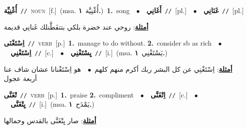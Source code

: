 \documentclass[10pt,a4paper,twoside]{article} %
\begin{document}
\begin{multicols}{2}
{\setlength\topsep{0pt}\textbf{\foreignlanguage{arabic}{أُغْنِيِّة}}\ {\color{gray}\texttt{//}\color{black}}\ \textsc{noun}\ [f.]\ \color{gray}(msa. \foreignlanguage{arabic}{أُغْنِيَّة}~\foreignlanguage{arabic}{\textbf{١.}})\color{black}\ \textbf{1.}~song\ \ $\bullet$\ \ \setlength\topsep{0pt}\textbf{\foreignlanguage{arabic}{أَغَانِي}}\ {\color{gray}\texttt{//}\color{black}}\ [pl.]\ \ $\bullet$\ \ \setlength\topsep{0pt}\textbf{\foreignlanguage{arabic}{غَنَانِي}}\ {\color{gray}\texttt{//}\color{black}}\ [pl.]\  \begin{flushright}\color{gray}\foreignlanguage{arabic}{\textbf{\underline{\foreignlanguage{arabic}{أمثلة}}}: روحي عند خضرة بلكي بتتفَطَّنلك غَنانِي قديمة}\end{flushright}\color{black}} \vspace{2mm}

{\setlength\topsep{0pt}\textbf{\foreignlanguage{arabic}{اِسْتَغْنَى}}\ {\color{gray}\texttt{//}\color{black}}\ \textsc{verb}\ [p.]\ \textbf{1.}~manage to do without.  \textbf{2.}~consider sb as rich\ \ $\bullet$\ \ \setlength\topsep{0pt}\textbf{\foreignlanguage{arabic}{اِسْتَغْنِي}}\ {\color{gray}\texttt{//}\color{black}}\ [c.]\ \ $\bullet$\ \ \setlength\topsep{0pt}\textbf{\foreignlanguage{arabic}{يِسْتَغْنِي}}\ {\color{gray}\texttt{//}\color{black}}\ [i.]\ \color{gray}(msa. \foreignlanguage{arabic}{يَسْتَغْنِي}~\foreignlanguage{arabic}{\textbf{١.}})\color{black}\  \begin{flushright}\color{gray}\foreignlanguage{arabic}{\textbf{\underline{\foreignlanguage{arabic}{أمثلة}}}: اِسْتَغْنِي عن كل البشر ربك أكرم منهم كلهم\ $\bullet$\ \  هو اِسْتَغْنانا عشان شاف عنا أربعة عجول}\end{flushright}\color{black}} \vspace{2mm}

{\setlength\topsep{0pt}\textbf{\foreignlanguage{arabic}{تْغَنَّى}}\ {\color{gray}\texttt{//}\color{black}}\ \textsc{verb}\ [p.]\ \textbf{1.}~praise  \textbf{2.}~compliment\ \ $\bullet$\ \ \setlength\topsep{0pt}\textbf{\foreignlanguage{arabic}{اِتْغَنَّى}}\ {\color{gray}\texttt{//}\color{black}}\ [c.]\ \ $\bullet$\ \ \setlength\topsep{0pt}\textbf{\foreignlanguage{arabic}{يِتْغَنَّى}}\ {\color{gray}\texttt{//}\color{black}}\ [i.]\ \color{gray}(msa. \foreignlanguage{arabic}{يَمْدَح}~\foreignlanguage{arabic}{\textbf{١.}})\color{black}\  \begin{flushright}\color{gray}\foreignlanguage{arabic}{\textbf{\underline{\foreignlanguage{arabic}{أمثلة}}}: صار يِتْغَنَّى بالقدس وجمالها}\end{flushright}\color{black}} \vspace{2mm}


\end{multicols}
\end{document}
